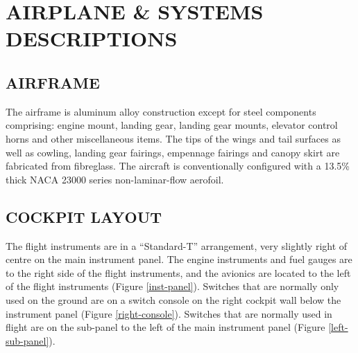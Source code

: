 \chapter{AIRPLANE \& SYSTEMS DESCRIPTIONS} \vspace{\minitocspacebefore} \minitoc

\cleardoublepage

\renewcommand{\textfraction}{0.1} 
\renewcommand{\topfraction}{.9} 
\renewcommand{\bottomfraction}{.9} 
\renewcommand{\floatpagefraction}{0.35} \setcounter{totalnumber}{5} 

\section{AIRFRAME}

The airframe is aluminum alloy construction except for steel components comprising: engine mount, landing gear, landing gear mounts, elevator control horns and other miscellaneous items. The tips of the wings and tail surfaces as well as cowling, landing gear fairings, empennage fairings and canopy skirt are fabricated from fibreglass. The aircraft is conventionally configured with a 13.5\% thick NACA 23000 series non-laminar-flow aerofoil.

\section{COCKPIT LAYOUT}

The flight instruments are in a ``Standard-T'' arrangement, very slightly right of centre on the main instrument panel. The engine instruments and fuel gauges are to the right side of the flight instruments, and the avionics are located to the left of the flight instruments (Figure \ref{inst-panel}). Switches that are normally only used on the ground are on a switch console on the right cockpit wall below the instrument panel (Figure \ref{right-console}). Switches that are normally used in flight are on the sub-panel to the left of the main instrument panel (Figure \ref{left-sub-panel}).

